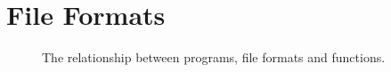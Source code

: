 \section{File Formats}


\begin{figure}[tbp]
  
  \caption{The relationship between programs, file formats and functions.}
  \label{fig:bg:fileformats}
\end{figure}
